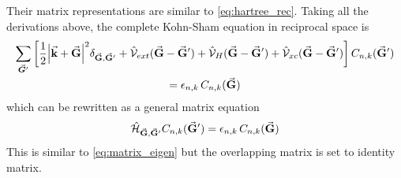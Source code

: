Their matrix representations are similar to \eqref{eq:hartree_rec}. Taking all the derivations above, the complete Kohn-Sham equation in reciprocal space  is 
\begin{multline}\label{eq:KS_rec}
    \sum_{\va*{G}'} \left[ \frac{1}{2} \abs{\va{k} + \va{G}}^2 \delta_{\va{G},\va{G}'} + \hat{\mathcal{V}}_{ext}(\va{G} - \va{G}') + \hat{\mathcal{V}}_H(\va{G} - \va{G}') + \hat{\mathcal{V}}_{xc}(\va{G} - \va{G}') \right] C_{n,k}(\va{G}') \\
    = \epsilon_{n,k}\, C_{n,k}(\va{G})
\end{multline}
which can be rewritten as a general matrix equation 
\begin{equation}
    \hat{\mathcal{H}}_{\va{G},\va{G}'} C_{n,k}(\va{G}') =  \epsilon_{n,k}\, C_{n,k}(\va{G})
\end{equation}
This is similar to \eqref{eq:matrix_eigen} but the overlapping matrix is set to identity matrix.

